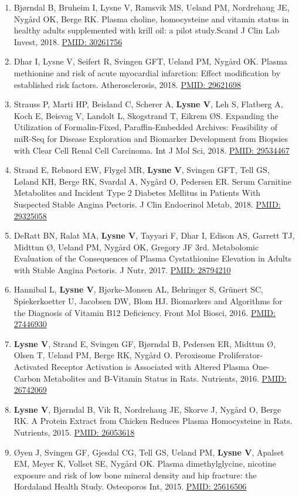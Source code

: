 \documentclass[11pt, a4paper]{awesome-cv}
\begin{document}
\begin{enumerate}
\item
  Bjørndal B, Bruheim I, Lysne V, Ramsvik MS, Ueland PM, Nordrehaug JE, Nygård OK, Berge RK. Plasma choline, homocysteine and vitamin status in healthy adults supplemented with krill oil: a pilot study.Scand J Clin Lab Invest, 2018. \href{https://www.ncbi.nlm.nih.gov/pubmed/30261756}{PMID: 30261756}
\item
  Dhar I, Lysne V, Seifert R, Svingen GFT, Ueland PM, Nygård OK. Plasma methionine and risk of acute myocardial infarction: Effect modification by established risk factors. Atherosclerosis, 2018. \href{https://www.ncbi.nlm.nih.gov/pubmed/29621698}{PMID: 29621698}
\item
  Strauss P, Marti HP, Beisland C, Scherer A, \textbf{Lysne V}, Leh S, Flatberg A, Koch E, Beisvag V, Landolt L, Skogstrand T, Eikrem ØS. Expanding the Utilization of Formalin-Fixed, Paraffin-Embedded Archives: Feasibility of miR-Seq for Disease Exploration and Biomarker Development from Biopsies with Clear Cell Renal Cell Carcinoma. Int J Mol Sci, 2018. \href{https://www.ncbi.nlm.nih.gov/pubmed/29534467}{PMID: 29534467}
\item
  Strand E, Rebnord EW, Flygel MR, \textbf{Lysne V}, Svingen GFT, Tell GS, Løland KH, Berge RK, Svardal A, Nygård O, Pedersen ER. Serum Carnitine Metabolites and Incident Type 2 Diabetes Mellitus in Patients With Suspected Stable Angina Pectoris. J Clin Endocrinol Metab, 2018. \href{https://www.ncbi.nlm.nih.gov/pubmed/29325058}{PMID: 29325058}
\item
  DeRatt BN, Ralat MA, \textbf{Lysne V}, Tayyari F, Dhar I, Edison AS, Garrett TJ, Midttun Ø, Ueland PM, Nygård OK, Gregory JF 3rd. Metabolomic Evaluation of the Consequences of Plasma Cystathionine Elevation in Adults with Stable Angina Pectoris. J Nutr, 2017. \href{https://www.ncbi.nlm.nih.gov/pubmed/28794210}{PMID: 28794210}
\item
  Hannibal L, \textbf{Lysne V}, Bjørke-Monsen AL, Behringer S, Grünert SC, Spiekerkoetter U, Jacobsen DW, Blom HJ. Biomarkers and Algorithms for the Diagnosis of Vitamin B12 Deficiency. Front Mol Biosci, 2016. \href{https://www.ncbi.nlm.nih.gov/pubmed/}{PMID: 27446930}
\item
  \textbf{Lysne V}, Strand E, Svingen GF, Bjørndal B, Pedersen ER, Midttun Ø, Olsen T, Ueland PM, Berge RK, Nygård O. Peroxisome Proliferator-Activated Receptor Activation is Associated with Altered Plasma One-Carbon Metabolites and B-Vitamin Status in Rats. Nutrients, 2016. \href{https://www.ncbi.nlm.nih.gov/pubmed/26742069}{PMID: 26742069}
\item
  \textbf{Lysne V}, Bjørndal B, Vik R, Nordrehaug JE, Skorve J, Nygård O, Berge RK. A Protein Extract from Chicken Reduces Plasma Homocysteine in Rats. Nutrients, 2015. \href{https://www.ncbi.nlm.nih.gov/pubmed/26053618}{PMID: 26053618}
\item
  Øyen J, Svingen GF, Gjesdal CG, Tell GS, Ueland PM, \textbf{Lysne V}, Apalset EM, Meyer K, Vollset SE, Nygård OK. Plasma dimethylglycine, nicotine exposure and risk of low bone mineral density and hip fracture: the Hordaland Health Study. Osteoporos Int, 2015. \href{https://www.ncbi.nlm.nih.gov/pubmed/25616506}{PMID: 25616506}
\end{enumerate}
\end{document}
